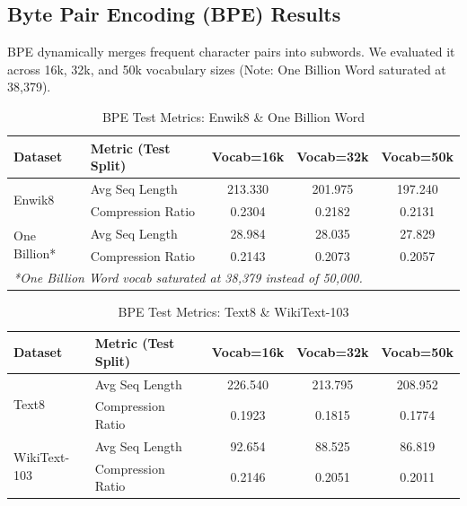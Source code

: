 \subsection{Byte Pair Encoding (BPE) Results}
BPE dynamically merges frequent character pairs into subwords. We evaluated it across 16k, 32k, and 50k vocabulary sizes (Note: One Billion Word saturated at 38,379).

\begin{table}[H]
\centering
\caption{BPE Test Metrics: Enwik8 \& One Billion Word}
\renewcommand{\arraystretch}{1.1}
\begin{tabular}{|l|l|c|c|c|}
\hline
\textbf{Dataset} & \textbf{Metric (Test Split)} & \textbf{Vocab=16k} & \textbf{Vocab=32k} & \textbf{Vocab=50k} \\ \hline
\multirow{2}{*}{Enwik8} 
 & Avg Seq Length & 213.330 & 201.975 & 197.240 \\ \cline{2-5}
 & Compression Ratio & 0.2304 & 0.2182 & 0.2131 \\ \hline
\multirow{2}{*}{One Billion*} 
 & Avg Seq Length & 28.984 & 28.035 & 27.829 \\ \cline{2-5}
 & Compression Ratio & 0.2143 & 0.2073 & 0.2057 \\ \hline
\multicolumn{5}{l}{\footnotesize \textit{*One Billion Word vocab saturated at 38,379 instead of 50,000.}}
\end{tabular}
\end{table}

\begin{table}[H]
\centering
\caption{BPE Test Metrics: Text8 \& WikiText-103}
\renewcommand{\arraystretch}{1.1}
\begin{tabular}{|l|l|c|c|c|}
\hline
\textbf{Dataset} & \textbf{Metric (Test Split)} & \textbf{Vocab=16k} & \textbf{Vocab=32k} & \textbf{Vocab=50k} \\ \hline
\multirow{2}{*}{Text8} 
 & Avg Seq Length & 226.540 & 213.795 & 208.952 \\ \cline{2-5}
 & Compression Ratio & 0.1923 & 0.1815 & 0.1774 \\ \hline
\multirow{2}{*}{WikiText-103} 
 & Avg Seq Length & 92.654 & 88.525 & 86.819 \\ \cline{2-5}
 & Compression Ratio & 0.2146 & 0.2051 & 0.2011 \\ \hline
\end{tabular}
\end{table}

